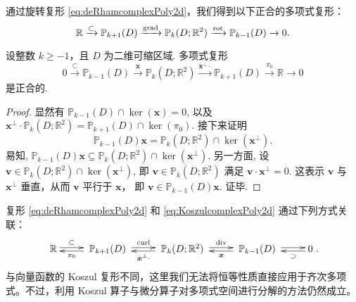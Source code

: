 通过旋转复形 \eqref{eq:deRhamcomplexPoly2d}，我们得到以下正合的多项式复形：
\begin{equation*}
\mathbb R\xrightarrow{\subset} \mathbb P_{k+1}(D)\xrightarrow{\operatorname{grad}} \mathbb P_k(D;\mathbb R^2) \xrightarrow{\operatorname*{rot}} \mathbb P_{k-1}(D)\xrightarrow{}0.
\end{equation*}


\begin{lemma}
设整数 $k\geq-1$，且 $D$ 为二维可缩区域.
多项式复形
\begin{equation}\label{eq:KoszulcomplexPoly2d}
0\xrightarrow{\subset}\mathbb P_{k-1}(D) \xrightarrow{\boldsymbol x} \mathbb P_k(D;\mathbb R^2) \xrightarrow{\boldsymbol x^{\perp}\cdot} \mathbb P_{k+1}(D)\xrightarrow{\pi_{0}}\mathbb R\xrightarrow{}0
\end{equation}
是正合的.  
\end{lemma}
\begin{proof}
显然有 $\mathbb P_{k-1}(D)\cap\ker(\boldsymbol{x})=0$, 以及 $\boldsymbol x^{\perp}\cdot\mathbb P_k(D;\mathbb R^2)=\mathbb P_{k+1}(D)\cap\ker(\pi_0)$. 接下来证明
$$
\mathbb P_{k-1}(D)\boldsymbol{x} = \mathbb P_k(D;\mathbb R^2)\cap\ker(\boldsymbol x^{\perp}).
$$ 
易知, $\mathbb P_{k-1}(D)\boldsymbol{x} \subseteq \mathbb P_k(D;\mathbb R^2)\cap\ker(\boldsymbol x^{\perp})$. 另一方面, 设 $\boldsymbol{v}\in\mathbb P_k(D;\mathbb R^2)\cap\ker(\boldsymbol x^{\perp})$, 即 $\boldsymbol{v}\in\mathbb P_k(D;\mathbb R^2)$ 满足 $\boldsymbol{v}\cdot \boldsymbol x^{\perp}=0$. 这表示 $\boldsymbol{v}$ 与 $\boldsymbol x^{\perp}$ 垂直，从而 $\boldsymbol{v}$ 平行于 $\boldsymbol{x}$， 即 $\boldsymbol{v}\in \mathbb P_{k-1}(D)\boldsymbol{x}$. 证毕.
\end{proof}

复形 \eqref{eq:deRhamcomplexPoly2d} 和 \eqref{eq:KoszulcomplexPoly2d} 通过下列方式关联：
\begin{equation}\label{eq:deRhamcomplexPolydouble2d}
\xymatrix{
\mathbb R\ar@<0.4ex>[r]^-{\subset} & \; \mathbb P_{k+1}(D)\; \ar@<0.4ex>[r]^-{\curl}\ar@<0.4ex>[l]^-{\pi_0}  & \; \mathbb P_k(D;\mathbb R^2) \ar@<0.4ex>[r]^-{\div}\; \ar@<0.4ex>[l]^-{\boldsymbol x^{\bot}\cdot} & \; \mathbb P_{k-1}(D)  \; \ar@<0.4ex>[r]^-{} \ar@<0.4ex>[l]^-{\boldsymbol x}
& 0 \ar@<0.4ex>[l]^-{\supset} }.
\end{equation}
与向量函数的 Koszul 复形不同，这里我们无法将恒等性质直接应用于齐次多项式。不过，利用 Koszul 算子与微分算子对多项式空间进行分解的方法仍然成立。



